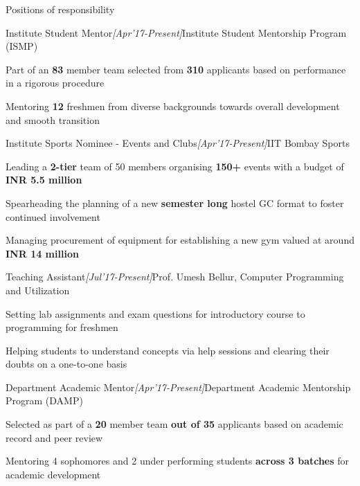 \documentclass[a4paper,10pt]{resume}%
\begin{document}
\begin{rSection}{{Positions of responsibility}}

\begin{rSubsection}{{Institute Student Mentor}}{\sl \small [Apr'17-Present]}{Institute Student Mentorship Program (ISMP)}
\vspace{-1.0mm}
\item Part of an \textbf{83} member team selected from \textbf{310} applicants based on performance in a rigorous procedure
\item Mentoring \textbf{12} freshmen from diverse backgrounds towards overall development and smooth transition
\end{rSubsection}
\vspace{-2mm}

\begin{rSubsection}{{Institute Sports Nominee - Events and Clubs}}{\sl \small [Apr'17-Present]}{IIT Bombay Sports}
\vspace{-1.0mm}
\item Leading a \textbf{2-tier} team of 50 members organising \textbf{150+} events with a budget of \textbf{INR 5.5 million}
\item Spearheading the planning of a new \textbf{semester long} hostel GC format  to foster continued involvement
\item Managing procurement of equipment for establishing a new gym valued at around \textbf{INR 14 million}
\end{rSubsection}
\vspace{-2mm}

\begin{rSubsection}{{Teaching Assistant}}{\sl \small [Jul'17-Present]}{Prof. Umesh Bellur, Computer Programming and Utilization}
\vspace{-1.0mm}
\item Setting lab assignments and exam questions for introductory course to programming for freshmen
\item Helping students to understand concepts via help sessions and clearing their doubts on a one-to-one basis
\end{rSubsection}
\vspace{-2mm}

\begin{rSubsection}{{Department Academic Mentor}}{\sl \small [Apr'17-Present]}{Department Academic Mentorship Program (DAMP)}
\vspace{-1.0mm}
\item Selected as part of a \textbf{20} member team \textbf{out of 35} applicants based on academic record and peer review
\item Mentoring 4 sophomores and 2 under performing students \textbf{across 3 batches} for academic development
\end{rSubsection}
\vspace{-2mm}


\end{rSection}
\end{document}
